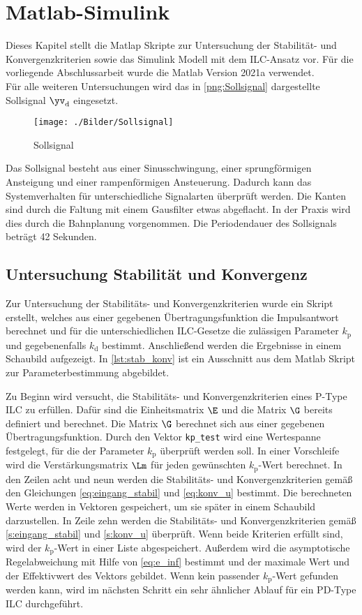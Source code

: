 \section{Matlab-Simulink}
Dieses Kapitel stellt die Matlap Skripte zur Untersuchung der Stabilität- und Konvergenzkriterien sowie das Simulink Modell mit dem ILC-Ansatz vor. Für die vorliegende Abschlussarbeit wurde die Matlab Version 2021a verwendet. \\
Für alle weiteren Untersuchungen wird das in \autoref{png:Sollsignal} dargestellte Sollsignal $\yv_\mathrm{d}$ eingesetzt. 
\begin{figure}[ht]
	\centering
	\texttt{[image: ./Bilder/Sollsignal]}
	\caption{Sollsignal}
	\label{png:Sollsignal}
\end{figure}
Das Sollsignal besteht aus einer Sinusschwingung, einer sprungförmigen Ansteigung und einer rampenförmigen Ansteuerung. Dadurch kann das Systemverhalten für unterschiedliche Signalarten überprüft werden. Die Kanten sind durch die Faltung mit einem Gausfilter etwas abgeflacht. In der Praxis wird dies durch die Bahnplanung vorgenommen. Die Periodendauer des Sollsignals beträgt 42 Sekunden.

\subsection{Untersuchung Stabilität und Konvergenz}
Zur Untersuchung der Stabilitäts- und Konvergenzkriterien wurde ein Skript erstellt, welches aus einer gegebenen Übertragungsfunktion die Impulsantwort berechnet und für die unterschiedlichen ILC-Gesetze die zulässigen Parameter $k_\mathrm{p}$ und gegebenenfalls $k_\mathrm{d}$ bestimmt. Anschließend werden die Ergebnisse in einem Schaubild aufgezeigt. In \autoref{lst:stab_konv} ist ein Ausschnitt aus dem Matlab Skript zur Parameterbestimmung abgebildet. 

Zu Beginn wird versucht, die Stabilitäts- und Konvergenzkriterien eines P-Type ILC zu erfüllen. Dafür sind die Einheitsmatrix $\E$ und die Matrix $\G$ bereits definiert und berechnet. Die Matrix $\G$ berechnet sich  aus einer gegebenen Übertragungsfunktion. Durch den Vektor \lstinline{kp_test} wird eine Wertespanne festgelegt, für die der Parameter $k_\mathrm{p}$ überprüft werden soll. In einer Vorschleife wird die Verstärkungsmatrix $\Lm$ für jeden gewünschten $k_\mathrm{p}$-Wert berechnet. In den Zeilen acht und neun werden die Stabilitäts- und Konvergenzkriterien gemäß den Gleichungen \ref{eq:eingang_stabil} und \ref{eq:konv_u} bestimmt. Die berechneten Werte werden in Vektoren gespeichert, um sie später in einem Schaubild darzustellen. In Zeile zehn werden die Stabilitäts- und Konvergenzkriterien gemäß \autoref{s:eingang_stabil} und \autoref{s:konv_u} überprüft. Wenn beide Kriterien erfüllt sind, wird der $k_\mathrm{p}$-Wert in einer Liste abgespeichert. Außerdem wird die asymptotische Regelabweichung mit Hilfe von \autoref{eq:e_inf} bestimmt und der maximale Wert und der Effektivwert des Vektors gebildet. Wenn kein passender $k_\mathrm{p}$-Wert gefunden werden kann, wird im nächsten Schritt ein sehr ähnlicher Ablauf für ein PD-Type ILC durchgeführt.

